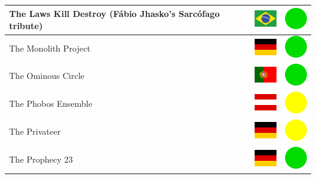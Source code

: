 \documentclass[12pt, a4paper, twoside]{report}
\begin{document}
\begin{center}
\begin{longtable}{|p{5cm}|p{2cm}|p{2cm}|}
 The Laws Kill Destroy (Fábio Jhasko's Sarcófago tribute)   & \includegraphics[width=1cm]{4x3/br} &   \includegraphics[width=1cm]{likes/y} \\ \hline
 The Monolith Project                                       & \includegraphics[width=1cm]{4x3/de} &   \includegraphics[width=1cm]{likes/y} \\ \hline
 The Ominous Circle                                         & \includegraphics[width=1cm]{4x3/pt} &   \includegraphics[width=1cm]{likes/y} \\ \hline
 The Phobos Ensemble                                        & \includegraphics[width=1cm]{4x3/at} &   \includegraphics[width=1cm]{likes/m} \\ \hline
 The Privateer                                              & \includegraphics[width=1cm]{4x3/de} &   \includegraphics[width=1cm]{likes/m} \\ \hline
 The Prophecy 23                                            & \includegraphics[width=1cm]{4x3/de} &   \includegraphics[width=1cm]{likes/y} \\ \hline

\end{longtable}
\end{center}
\end{document}

